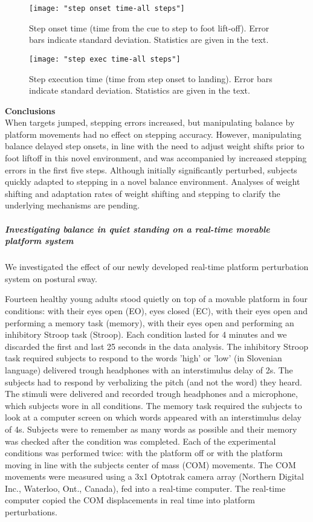 \begin{figure*}[!ht]
	\centering
	\texttt{[image: "step onset time-all steps"]}
	\caption{Step onset time (time from the cue to step to foot lift-off). Error bars indicate standard deviation. Statistics are given in the text.}
	\label{fig:stepOnsetTimeAll}
\end{figure*}

\begin{figure*}[!ht]
	\centering
	\texttt{[image: "step exec time-all steps"]}
	\caption{Step execution time (time from step onset to landing). Error bars indicate standard deviation. Statistics are given in the text.}
	\label{fig:stepExecTimeAll}
\end{figure*}

\textbf{Conclusions}\\
When targets jumped, stepping errors increased, but manipulating balance by platform movements had no effect on stepping accuracy. However, manipulating balance delayed step onsets, in line with the need to adjust weight shifts prior to foot liftoff in this novel environment, and was accompanied by increased stepping errors in the first five steps. Although initially significantly perturbed, subjects quickly adapted to stepping in a novel balance environment. Analyses of weight shifting and adaptation rates of weight shifting and stepping to clarify the underlying mechanisms are pending.

\subparagraph*{Investigating balance in quiet standing on a real-time movable platform system}
We investigated the effect of our newly developed real-time platform perturbation system on postural sway.

Fourteen healthy young adults stood quietly on top of a movable platform in four conditions: with their eyes open (EO), eyes closed (EC), with their eyes open and performing a memory task (memory), with their eyes open and performing an inhibitory Stroop task (Stroop). Each condition lasted for 4 minutes and we discarded the first and last 25 seconds in the data analysis. The inhibitory Stroop task required subjects to respond to the words 'high' or 'low' (in Slovenian language) delivered trough headphones with an interstimulus delay of 2s. The subjects had to respond by verbalizing the pitch (and not the word) they heard. The stimuli were delivered and recorded trough headphones and a microphone, which subjects wore in all conditions. The memory task required the subjects to look at a computer screen on which words appeared with an interstimulus delay of 4s. Subjects were to remember as many words as possible and their memory was checked after the condition was completed.
Each of the experimental conditions was performed twice: with the platform off or with the platform moving in line with the subjects center of mass (COM) movements. The COM movements were measured using a 3x1 Optotrak camera array (Northern Digital Inc., Waterloo, Ont., Canada), fed into a real-time computer. The real-time computer copied the COM displacements in real time into platform perturbations.

